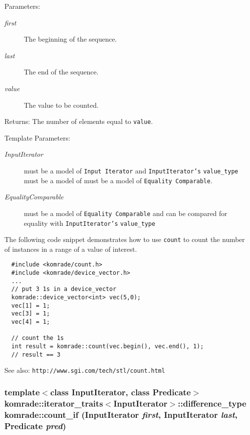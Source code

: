 \begin{Desc}
\item[Parameters:]
\begin{description}
\item[{\em first}]The beginning of the sequence. \item[{\em last}]The end of the sequence. \item[{\em value}]The value to be counted. \end{description}
\end{Desc}
\begin{Desc}
\item[Returns:]The number of elements equal to {\tt value}.\end{Desc}
\begin{Desc}
\item[Template Parameters:]
\begin{description}
\item[{\em InputIterator}]must be a model of {\tt Input Iterator} and {\tt InputIterator's} {\tt value\_\-type} must be a model of must be a model of {\tt Equality Comparable}. \item[{\em EqualityComparable}]must be a model of {\tt Equality Comparable} and can be compared for equality with {\tt InputIterator's} {\tt value\_\-type} \end{description}
\end{Desc}
The following code snippet demonstrates how to use {\tt count} to count the number of instances in a range of a value of interest. 

\begin{Code}\begin{verbatim}  #include <komrade/count.h>
  #include <komrade/device_vector.h>
  ...
  // put 3 1s in a device_vector
  komrade::device_vector<int> vec(5,0);
  vec[1] = 1;
  vec[3] = 1;
  vec[4] = 1;
  
  // count the 1s
  int result = komrade::count(vec.begin(), vec.end(), 1);
  // result == 3
\end{verbatim}
\end{Code}



\begin{Desc}
\item[See also:]{\tt http://www.sgi.com/tech/stl/count.html} \end{Desc}
\subsubsection[count\_\-if]{\setlength{\rightskip}{0pt plus 5cm}template$<$class InputIterator, class Predicate$>$ komrade::iterator\_\-traits$<$InputIterator$>$::difference\_\-type komrade::count\_\-if (InputIterator {\em first}, \/  InputIterator {\em last}, \/  Predicate {\em pred})\hspace{0.3cm}{\tt  [inline]}}\label{group__counting_gbe14c51965cd3ef158086aeec9f2cce2}


